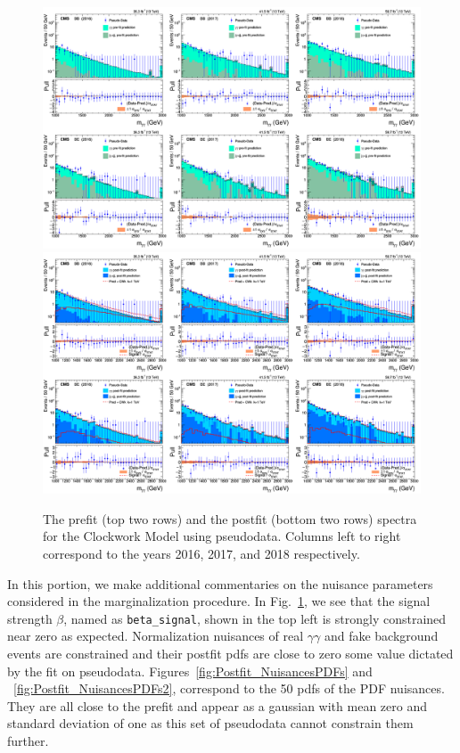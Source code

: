 \begin{figure}[h!]\centering
\includegraphics[width=1.\linewidth]{fig/PRED_PRE_CWk.png}
\includegraphics[width=1.\linewidth]{fig/PRED_POST_CWk.png}
\caption{The prefit (top two rows) and the postfit (bottom two rows) \mgg spectra for the Clockwork Model using pseudodata.
Columns left to right correspond to the years 2016, 2017, and 2018 respectively.}
\label{Fig:Postfit_mgg_Clockwork_pseudo}
\end{figure}

In this portion, we make additional commentaries on the nuisance parameters considered in the marginalization procedure. In Fig.~\ref{Fig:Postfit_mgg_Clockwork_pseudo}, we see that the signal strength $\beta$, named as \texttt{beta\_signal}, shown in the top left is strongly constrained near zero as expected. Normalization nuisances of real $\gamma\gamma$ and fake background events are  constrained and their postfit pdfs are close to zero some value dictated by the fit on pseudodata. Figures~\ref{fig:Postfit_NuisancesPDFs} and ~\ref{fig:Postfit_NuisancesPDFs2}, correspond to the 50 pdfs of the PDF nuisances. They are all close to the prefit and appear as a gaussian with mean zero and standard deviation of one as this set of pseudodata cannot constrain them further.

